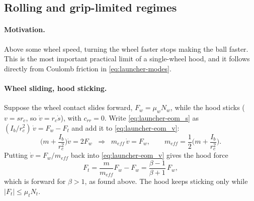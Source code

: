 \subsection{Rolling and grip-limited regimes}
\label{sec:launcher:grip}

\paragraph{Motivation.} Above some wheel speed, turning the wheel faster stops making the ball faster.
This is the most important practical limit of a single-wheel hood, and it follows directly from Coulomb
friction in \eqref{eq:launcher-modes}.

\paragraph{Wheel sliding, hood sticking.} Suppose the wheel contact slides forward,
$F_w = \mu_w N_w$, while the hood sticks ($v = s r_c$, so $\dot v = r_c \dot s$), with $c_{rr} = 0$. Write
\eqref{eq:launcher-eom_s} as $(I_b/r_c^2)\,\dot v = F_w - F_t$ and add it to \eqref{eq:launcher-eom_v}:
\begin{equation}
  \Big(m + \frac{I_b}{r_c^2}\Big)\dot v = 2F_w
  \;\;\Longrightarrow\;\;
  m_{eff}\,\dot v = F_w, \qquad m_{eff} = \frac{1}{2}\Big(m + \frac{I_b}{r_c^2}\Big).
  \label{eq:launcher-meff}
\end{equation}
Putting $\dot v = F_w/m_{eff}$ back into \eqref{eq:launcher-eom_v} gives the hood force
\begin{equation}
  F_t = \frac{m}{m_{eff}}F_w - F_w = \frac{\beta - 1}{\beta + 1}\,F_w ,
  \label{eq:launcher-Ft}
\end{equation}
which is forward for $\beta > 1$, as found above. The hood keeps sticking only while
$|F_t| \le \mu_t N_t$.

